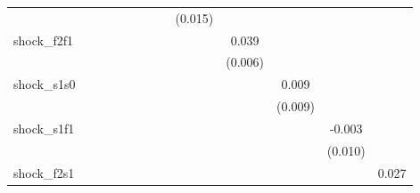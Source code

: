 {\begin{tabular}{l*{12}{c}}
            &                     &                     &                     &                     &                     &                     &                     &     (0.015)         &                     &                     &                     &                     \\
\addlinespace
shock\_f2f1  &                     &                     &                     &                     &                     &                     &                     &                     &       0.039\sym{***}&                     &                     &                     \\
            &                     &                     &                     &                     &                     &                     &                     &                     &     (0.006)         &                     &                     &                     \\
\addlinespace
shock\_s1s0  &                     &                     &                     &                     &                     &                     &                     &                     &                     &       0.009         &                     &                     \\
            &                     &                     &                     &                     &                     &                     &                     &                     &                     &     (0.009)         &                     &                     \\
\addlinespace
shock\_s1f1  &                     &                     &                     &                     &                     &                     &                     &                     &                     &                     &      -0.003         &                     \\
            &                     &                     &                     &                     &                     &                     &                     &                     &                     &                     &     (0.010)         &                     \\
\addlinespace
shock\_f2s1  &                     &                     &                     &                     &                     &                     &                     &                     &                     &                     &                     &       0.027\sym{***}\\

\end{tabular}}
